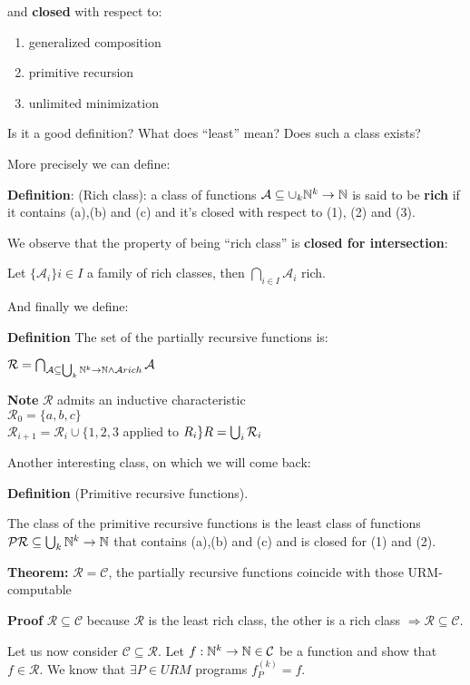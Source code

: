 and \textbf{closed} with respect to:
\begin{enumerate}
\item generalized composition
\item primitive recursion
\item unlimited minimization
\end{enumerate}

Is it a good definition? What does ``least'' mean? Does such a class exists?

More precisely we can define:

\textbf{Definition}: (Rich class): a class of functions $\mathcal{A} \subseteq \cup_k \mathbb{N}^k\rightarrow\mathbb{N}$ is said to be \textbf{rich} if it contains (a),(b) and (c) and it's closed with respect to (1), (2) and (3).

We observe that the property of being ``rich class'' is \textbf{closed for intersection}:

Let $\{\mathcal{A}_i\}i\in I$ a family of rich classes, then $\bigcap_{i\in I}\mathcal{A}_i$ rich.

And finally we define:

\textbf{Definition} The set of the partially recursive functions is:

$\mathcal{R} = \bigcap_{\mathcal{A} \subseteq \bigcup_k \mathbb{N}^k\rightarrow\mathbb{N}
\land
\mathcal{A}rich} \mathcal{A}$

\textbf{Note} $\mathcal{R}$ admits an inductive characteristic\\
$\mathcal{R}_0 = \{a,b,c\}$\\
$\mathcal{R}_{i+1} = \mathcal{R}_i \cup \{1,2,3 $ applied to $ R_i\}\\
R = \bigcup_i \mathcal{R}_i$

Another interesting class, on which we will come back:

\textbf{Definition} (Primitive recursive functions).

The class of the primitive recursive functions is the least class of functions $\mathcal{PR}\subseteq \bigcup_k\mathbb{N}^k\rightarrow\mathbb{N}$ that contains (a),(b) and (c) and is closed for (1) and (2).

\textbf{Theorem:} $\mathcal{R} = \mathcal{C}$, the partially recursive functions coincide with those URM-computable

\textbf{Proof} $ \mathcal{R} \subseteq \mathcal{C} $ because $\mathcal{R}$ is the least rich class, the other is a rich class $\Rightarrow \mathcal{R}\subseteq\mathcal{C}$.

Let us now consider $ \mathcal{C} \subseteq \mathcal{R} $. Let $ f:\mathbb{N}^k\rightarrow\mathbb{N} \in \mathcal{C} $ be a function and show that $ f \in \mathcal{R} $. We know that $ \exists P \in URM $ programs $ f_P^{(k)} = f$.

